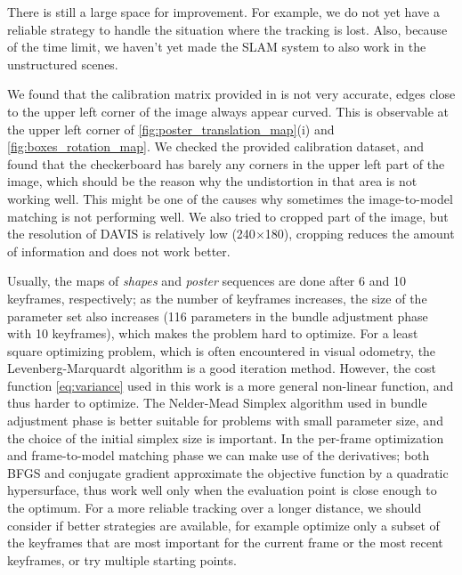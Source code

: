 There is still a large space for improvement. For example, we do not
yet have a reliable strategy to handle the situation where the
tracking is lost. Also, because of the time limit, we haven't yet made
the SLAM system to also work in the unstructured scenes.

We found that the calibration matrix provided in
\citep{mueggler2017event} is not very accurate, edges close to the
upper left corner of the image always appear curved. This is
observable at the upper left corner of
\cref{fig:poster_translation_map}(i) and
\cref{fig:boxes_rotation_map}. We checked the provided calibration
dataset, and found that the checkerboard has barely any corners in the
upper left part of the image, which should be the reason why the
undistortion in that area is not working well. This might be one of
the causes why sometimes the image-to-model matching is not performing
well. We also tried to cropped part of the image, but the resolution
of DAVIS is relatively low (240$\times$180), cropping reduces the
amount of information and does not work better.

Usually, the maps of \emph{shapes} and \emph{poster} sequences are
done after 6 and 10 keyframes, respectively; as the number of
keyframes increases, the size of the parameter set also increases (116
parameters in the bundle adjustment phase with 10 keyframes), which
makes the problem hard to optimize. For a least square optimizing
problem, which is often encountered in visual odometry, the
Levenberg-Marquardt algorithm\citep{press1988numerical} is a good
iteration method. However, the cost function \cref{eq:variance} used
in this work is a more general non-linear function, and thus harder to
optimize. The Nelder-Mead Simplex algorithm\citep{nelder1965simplex}
used in bundle adjustment phase is better suitable for problems with
small parameter size, and the choice of the initial simplex size is
important. In the per-frame optimization and frame-to-model matching
phase we can make use of the derivatives; both BFGS and conjugate
gradient approximate the objective function by a quadratic
hypersurface, thus work well only when the evaluation point is close
enough to the optimum. For a more reliable tracking over a longer
distance, we should consider if better strategies are available, for
example optimize only a subset of the keyframes that are most
important for the current frame or the most recent keyframes, or try
multiple starting points.
